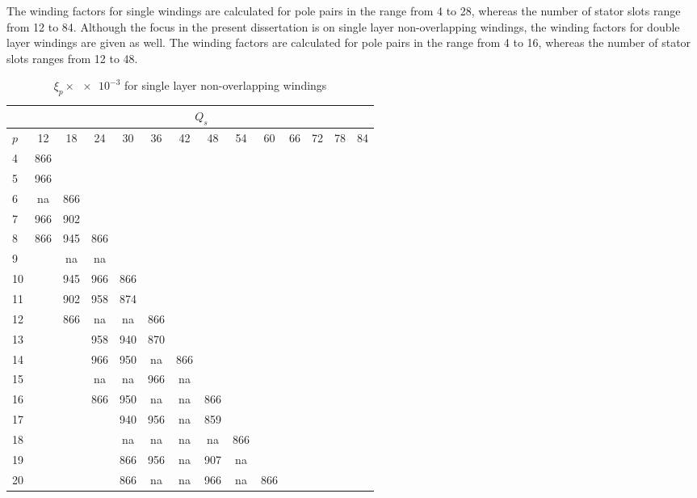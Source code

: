 The winding factors for single windings are calculated for pole pairs in the range from 4 to 28, whereas the number of stator slots range from 12 to 84. Although the focus in the present dissertation is on single layer non-overlapping windings, the winding factors for double layer windings are given as well. The winding factors are calculated for pole pairs in the range from 4 to 16, whereas the number of stator slots ranges from 12 to 48.
\begin{table}[htbp]
	\caption{$\xi_p \times \num{e-3}$ for single layer non-overlapping windings}
	\label{tab:xi_single}
	\centering
	 \begin{tabular}
		{|l||c|c|c|c|c|c|c|c|c|c|c|c|c|}\cline{2-14}
		\multicolumn{1}{c}{}& \multicolumn{13}{|c|}{$Q_s$}
		\\\hline
		$p$&12 &18 &24 &30 &36 &42 &48 &54 &60 &66 &72 &78 &84  \\\hline
		4  &866&   &   &   &   &   &   &   &   &   &   &   &    \\
		5  &966&   &   &   &   &   &   &   &   &   &   &   &    \\
		6  &na &866&   &   &   &   &   &   &   &   &   &   &    \\
		7  &966&902&   &   &   &   &   &   &   &   &   &   &    \\
		8  &866&945&866&   &   &   &   &   &   &   &   &   &    \\
		9  &   &na &na &   &   &   &   &   &   &   &   &   &    \\
		10 &   &945&966&866&   &   &   &   &   &   &   &   &    \\
		11 &   &902&958&874&   &   &   &   &   &   &   &   &    \\
		12 &   &866&na &na &866&   &   &   &   &   &   &   &    \\
		13 &   &   &958&940&870&   &   &   &   &   &   &   &    \\
		14 &   &   &966&950&na &866&   &   &   &   &   &   &    \\
		15 &   &   &na &na &966&na &   &   &   &   &   &   &    \\
		16 &   &   &866&950&na &na &866&   &   &   &   &   &    \\
		17 &   &   &   &940&956&na &859&   &   &   &   &   &    \\
		18 &   &   &   &na &na &na &na &866&   &   &   &   &    \\
		19 &   &   &   &866&956&na &907&na &   &   &   &   &    \\
		20 &   &   &   &866&na &na &966&na &866&   &   &   &    \\

\end{tabular}
\end{table}
